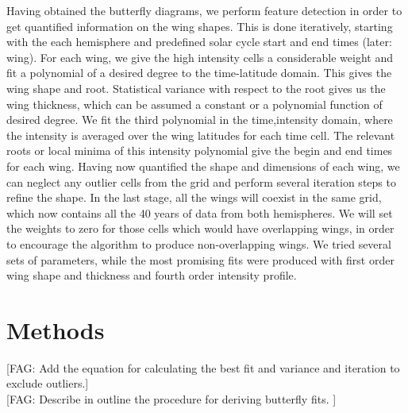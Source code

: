 \documentclass{aa}
\newcommand{\fag}[1]{\textcolor{midpurple}{[FAG: #1]}} %
\begin{document}
Having obtained the butterfly 
diagrams, we 
perform feature detection in order to get quantified information on the wing 
shapes. 
This is done iteratively, starting with the each hemisphere and predefined solar cycle start and end times 
(later: wing). For each wing, we give the high intensity cells a considerable weight and fit a polynomial of a desired 
degree to the time-latitude domain. This gives the wing shape and root. Statistical variance with respect to the root 
gives us the wing thickness, which can be assumed a constant or a polynomial function of desired degree. We fit the 
third polynomial in the time,intensity domain, where the intensity is averaged over the wing latitudes for each time 
cell. The relevant roots or local minima of this intensity polynomial give the begin and end times for each wing. Having 
now quantified the shape and dimensions of each wing, we can neglect any outlier cells from the grid and perform several 
iteration steps to refine the shape. In the last stage, all the wings will coexist in the same grid, which now contains 
all the 40 years of data from both hemispheres. We will set the weights to zero for those cells which would have 
overlapping wings, in order to encourage the algorithm to produce non-overlapping wings. We tried several sets of 
parameters, while the most promising fits were produced with first order wing shape and thickness and fourth order 
intensity profile.


\section{Methods}
\fag{Add the equation for calculating the best fit and variance and iteration to exclude outliers.}\\
\fag{Describe in outline the procedure for deriving butterfly fits.
}
\end{document}
